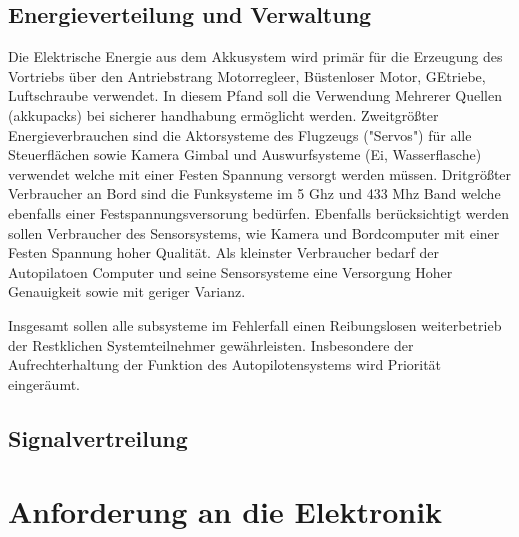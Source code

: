 \subsection{Energieverteilung und Verwaltung}

Die Elektrische Energie aus dem Akkusystem wird primär für die Erzeugung des Vortriebs über den Antriebstrang Motorregleer, Büstenloser Motor, GEtriebe, Luftschraube verwendet.
In diesem Pfand soll die Verwendung Mehrerer Quellen (akkupacks) bei sicherer handhabung ermöglicht werden.
Zweitgrößter Energieverbrauchen sind die Aktorsysteme des Flugzeugs ("Servos") für alle Steuerflächen sowie Kamera Gimbal und Auswurfsysteme (Ei, Wasserflasche) verwendet welche mit einer Festen Spannung versorgt werden müssen.
Dritgrößter Verbraucher an Bord sind die Funksysteme im 5 Ghz und 433 Mhz Band welche ebenfalls einer Festspannungsversorung bedürfen.
Ebenfalls berücksichtigt werden sollen Verbraucher des Sensorsystems, wie Kamera und Bordcomputer mit einer Festen Spannung hoher Qualität.
Als kleinster Verbraucher bedarf der Autopilatoen Computer und seine Sensorsysteme eine Versorgung Hoher Genauigkeit sowie mit geriger Varianz.

Insgesamt sollen alle subsysteme im Fehlerfall einen Reibungslosen weiterbetrieb der Restklichen Systemteilnehmer gewährleisten. Insbesondere der Aufrechterhaltung der Funktion des Autopilotensystems wird Priorität eingeräumt.


\subsection{Signalvertreilung}



\section{Anforderung an die Elektronik}